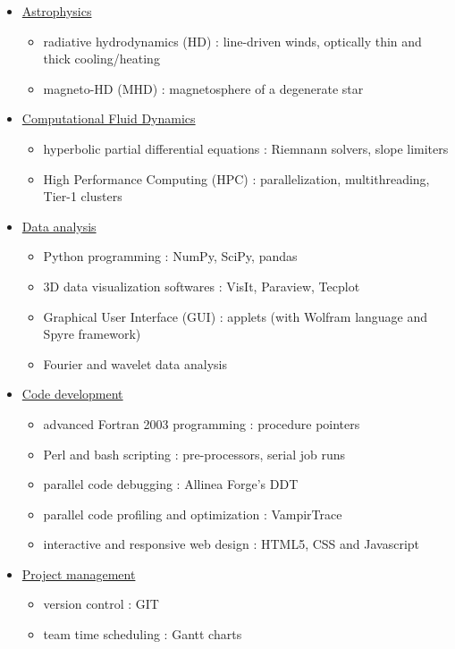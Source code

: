 \documentclass[a4paper,12pt,onecolumn]{article}
\begin{document}
\begin{adjustwidth}{-0.5cm}{-0.5cm}
\begin{itemize} %
\setlength\itemsep{-0.2em}
\setlength{\itemindent}{-1em}
\item[] \underline{Astrophysics }
\begin{itemize}
\setlength\itemsep{-0.2em}
\setlength{\itemindent}{-2em}
\item radiative hydrodynamics (HD) : line-driven winds, optically thin and thick cooling/heating
\item magneto-HD (MHD) : magnetosphere of a degenerate star
\end{itemize}
\item[] \underline{Computational Fluid Dynamics} 
\begin{itemize}
\setlength\itemsep{-0.2em}
\setlength{\itemindent}{-2em}
\item hyperbolic partial differential equations : Riemnann solvers, slope limiters 
\item High Performance Computing (HPC) : parallelization, multithreading, Tier-1 clusters 
\end{itemize}
\item[] \underline{Data analysis } 
\begin{itemize}
\setlength\itemsep{-0.2em}
\setlength{\itemindent}{-2em}
\item Python programming : NumPy, SciPy, pandas
\item 3D data visualization softwares : VisIt, Paraview, Tecplot
\item Graphical User Interface (GUI) : applets (with Wolfram language and Spyre framework)
\item Fourier and wavelet data analysis
\end{itemize}
\item[] \underline{Code development}
\begin{itemize}
\setlength\itemsep{-0.2em}
\setlength{\itemindent}{-2em}
\item advanced Fortran 2003 programming : procedure pointers
\item Perl and bash scripting : pre-processors, serial job runs
\item parallel code debugging : Allinea Forge's DDT
\item parallel code profiling and optimization : VampirTrace 
\item interactive and responsive web design : HTML5, CSS and Javascript
\end{itemize}
\item[] \underline{Project management } 
\begin{itemize}
\setlength\itemsep{-0.2em}
\setlength{\itemindent}{-2em}
\item version control : GIT
\item team time scheduling : Gantt charts
\end{itemize}
\end{itemize}
\end{adjustwidth}
\end{document}
